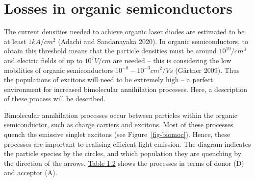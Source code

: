 \documentclass[
  letterpaper,
  DIV=11,
  numbers=noendperiod,
  oneside]{scrreprt}
\begin{document}
\hypertarget{losses-in-organic-semiconductors}{%
\section{Losses in organic
semiconductors}\label{losses-in-organic-semiconductors}}

The current densities needed to achieve organic laser diodes are
estimated to be at least \(1 kA/cm^2\) (Adachi and Sandanayaka 2020). In
organic semiconductors, to obtain this threshold means that the particle
densities must be around \(10^{19}/cm^3\) and electric fields of up to
\(10^7 V/cm\) are needed -- this is considering the low mobilities of
organic semiconductors \(10^{-8}-10^{-3}cm^2/Vs\) (Gärtner 2009). Thus
the populations of excitons will need to be extremely high -- a perfect
environment for increased bimolecular annihilation processes. Here, a
description of these process will be described.

Bimolecular annihilation processes occur between particles within the
organic semiconductor, such as charge carriers and excitons. Most of
these processes quench the emissive singlet excitons (see
Figure~\ref{fig-biomoc}). Hence, these processes are important to
realising efficient light emission. The diagram indicates the particle
species by the circles, and which population they are quenching by the
direction of the arrows. \protect\hyperlink{tab:bimoc}{Table 1.2} shows
the processes in terms of donor (D) and acceptor (A).
\end{document}
